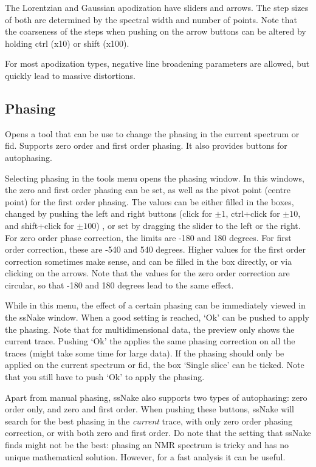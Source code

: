\documentclass[11pt,a4paper]{article}
\begin{document}
The Lorentzian and Gaussian apodization have sliders and arrows. The step sizes of both are determined by the spectral width and number of points. Note that the coarseness of the steps when pushing on the arrow buttons can be altered by holding ctrl (x10) or shift (x100).

For most apodization types, negative line broadening parameters are allowed, but quickly lead to massive distortions.


\subsection{Phasing}
Opens a tool that can be use to change the phasing in the current spectrum or fid. Supports zero order and first order phasing. It also provides buttons for autophasing.

Selecting phasing in the tools menu opens the phasing window. In this windows, the zero and first order phasing can be set, as well as the pivot point (centre point) for the first order phasing. The values can be either filled in the boxes,  changed by pushing the left and right buttons (click for $\pm1$, ctrl+click for $\pm10$, and shift+click for $\pm100$) , or set by dragging the
slider to the left or the right. For zero order phase correction, the limits are -180 and 180 degrees. For first order correction, these are -540 and 540 degrees. Higher values for the first order correction sometimes make sense, and can be filled in the box directly, or via clicking on the arrows. Note that the values for the zero order correction are circular, so that -180 and 180 degrees lead to the same effect.

While in this menu, the effect of a certain phasing can be immediately viewed in the ssNake window. When a good setting is reached, `Ok' can be pushed to apply the phasing. Note that for multidimensional data, the preview only shows the current trace. Pushing `Ok' the applies the same phasing correction on all the traces (might take some time for large data). If the phasing should only be applied on the current spectrum or fid, the box `Single slice' can be ticked. Note that you still have to push `Ok' to apply the phasing.

Apart from manual phasing, ssNake also supports two types of autophasing: zero order only, and zero and first order. When pushing these buttons, ssNake will search for the best phasing in the \textit{current} trace, with only zero order phasing correction, or with both zero and first order. Do note that the setting that ssNake finds might not be the best: phasing an NMR spectrum is tricky and has no unique mathematical solution.
However, for a fast analysis it can be useful.
\end{document}
